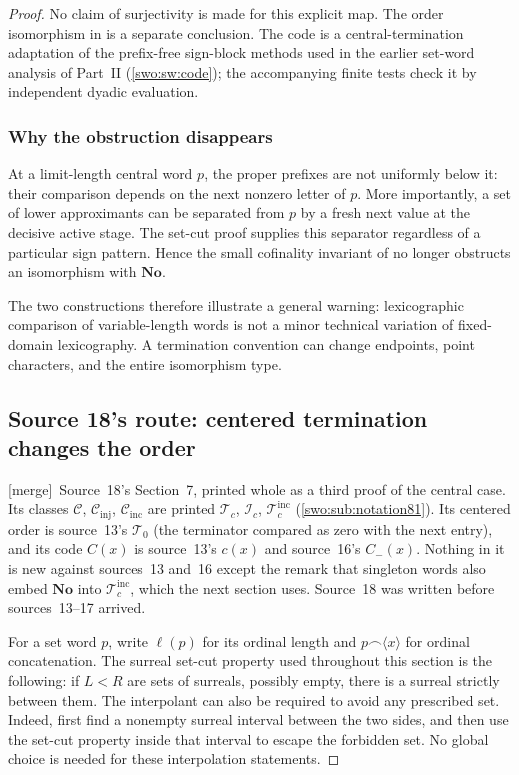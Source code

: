 \documentclass[11pt]{article}
\theoremstyle{definition}
\theoremstyle{remark}
\newcommand{\No}{\mathbf{No}}
\newcommand{\Words}{\mathcal I}
\newcommand{\WordsAll}{\mathcal T}
\newcommand{\merge}{\textsf{[merge]}}
\newcommand{\WordsInc}{\mathcal T^{\mathrm{inc}}}
\begin{document}
\begin{proof}
No claim of surjectivity is made for this explicit map. The order
isomorphism in  is a separate conclusion.
The code is a central-termination adaptation of the prefix-free
sign-block methods used in the earlier set-word analysis
of Part~II (\cref{swo:sw:code}); the accompanying finite tests check it by
independent dyadic evaluation.

\subsubsection{Why the obstruction disappears}

At a limit-length central word $p$, the proper prefixes are not
uniformly below it: their comparison depends on the next nonzero
letter of $p$. More importantly, a set of lower approximants can be
separated from $p$ by a fresh next value at the decisive active stage.
The set-cut proof supplies this separator regardless of a particular
sign pattern. Hence the small cofinality invariant of
 no longer obstructs an isomorphism
with $\No$.

The two constructions therefore illustrate a general warning:
lexicographic comparison of variable-length words is not a minor
technical variation of fixed-domain lexicography. A termination
convention can change endpoints, point characters, and the entire
isomorphism type.

\subsection{Source 18's route: centered termination changes the order}\label{swo:vii:sub:sh-centered}

\merge\ Source~18's Section~7, printed whole as a third proof of the central
case. Its classes $\mathcal C$, $\mathcal C_{\mathrm{inj}}$,
$\mathcal C_{\mathrm{inc}}$ are printed $\WordsAll_c$, $\Words_c$, $\WordsInc_c$
(\cref{swo:sub:notation81}). Its centered order is source~13's $\WordsAll_0$
(the terminator compared as zero with the next entry), and its code $C(x)$
is source~13's $c(x)$ and source~16's $C_-(x)$. Nothing in it is new against
sources~13 and~16 except the remark that singleton words also embed $\No$
into $\WordsInc_c$, which the next section uses. Source~18 was written
before sources~13--17 arrived.
\label{swo:sh:wv:centered}

For a set word \(p\), write \(\ell(p)\) for its ordinal length and
\(p\mathbin{\frown}\langle x\rangle\) for ordinal concatenation.
The surreal set-cut property used throughout this section is the following:
if \(L<R\) are sets of surreals, possibly empty, there is a surreal
strictly between them.  The interpolant can also be required to avoid
any prescribed set.  Indeed, first find a nonempty surreal interval
between the two sides, and then use the set-cut property inside that
interval to escape the forbidden set.  No global choice is needed
for these interpolation statements.


\end{proof}
\end{document}
